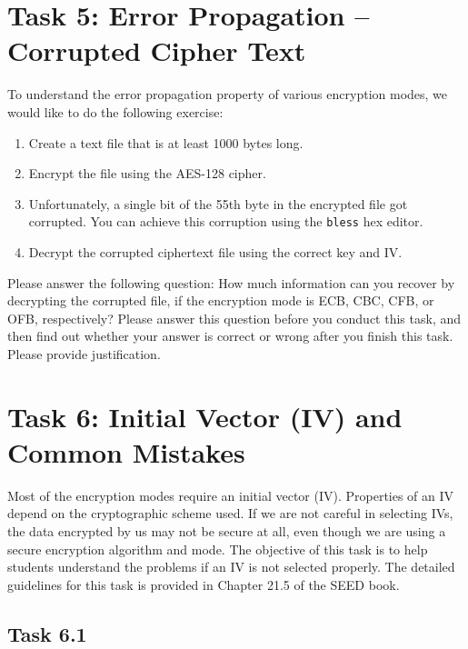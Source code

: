 \section{Task 5: Error Propagation -- Corrupted Cipher Text} 


To understand the error propagation property of various encryption modes, we would like to
do the following exercise:

\begin{enumerate}
\item Create a text file that is at least 1000 bytes long.  
\item Encrypt the file using the AES-128 cipher.
\item Unfortunately, a single bit of the 55th byte in the encrypted 
      file got corrupted. You can achieve this corruption using 
      the \texttt{bless} hex editor.
\item Decrypt the corrupted ciphertext file using the correct key and IV.
\end{enumerate}

Please answer the following question: 
How much information can you recover by decrypting the corrupted file, if the 
encryption mode is ECB, CBC, CFB, or OFB, respectively? Please answer this 
question before you conduct this task, and then find out whether your answer
is correct or wrong after you finish this task. 
Please provide justification.





\section{Task 6: Initial Vector (IV) and Common Mistakes}

Most of the encryption modes require an initial vector (IV). Properties of an IV depend 
on the cryptographic scheme used. If we are not careful in selecting IVs,
the data encrypted by us may not be secure at all, even though we are using 
a secure encryption algorithm and mode. The objective of this task is to
help students understand the problems if an IV is not selected properly. 
The detailed guidelines for this task is provided in 
Chapter 21.5 of the SEED book.


\subsection{Task 6.1} 

